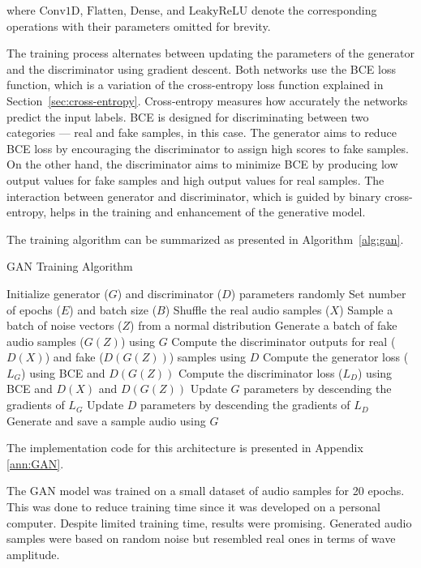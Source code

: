 where $\text{Conv1D}$, $\text{Flatten}$, $\text{Dense}$, and $\text{LeakyReLU}$ denote the corresponding operations with their parameters omitted for brevity.

The training process alternates between updating the parameters of the generator and the discriminator using gradient descent. Both networks use the \ac{BCE} loss function, which is a variation of the cross-entropy loss function explained in Section~\ref{sec:cross-entropy}. Cross-entropy measures how accurately the networks predict the input labels. \Ac{BCE} is designed for discriminating between two categories — real and fake samples, in this case. The generator aims to reduce \ac{BCE} loss by encouraging the discriminator to assign high scores to fake samples. On the other hand, the discriminator aims to minimize \ac{BCE} by producing low output values for fake samples and high output values for real samples. The interaction between generator and discriminator, which is guided by binary cross-entropy, helps in the training and enhancement of the generative model.

The training algorithm can be summarized as presented in Algorithm~\ref{alg:gan}.

\begin{algorithm}
\caption{\ac{GAN} Training Algorithm}
\label{alg:gan}
\begin{algorithmic}[1]
\State Initialize generator ($G$) and discriminator ($D$) parameters randomly
\State Set number of epochs ($E$) and batch size ($B$)
\State Shuffle the real audio samples ($X$)
\State Sample a batch of noise vectors ($Z$) from a normal distribution
\State Generate a batch of fake audio samples ($G(Z)$) using $G$
\State Compute the discriminator outputs for real ($D(X)$) and fake ($D(G(Z))$) samples using $D$
\State Compute the generator loss ($L_G$) using BCE and $D(G(Z))$
\State Compute the discriminator loss ($L_D$) using BCE and $D(X)$ and $D(G(Z))$
\State Update $G$ parameters by descending the gradients of $L_G$
\State Update $D$ parameters by descending the gradients of $L_D$
\EndFor
\State Generate and save a sample audio using $G$
\EndFor
\end{algorithmic}
\end{algorithm}


The implementation code for this architecture is presented in Appendix \ref{ann:GAN}.

The \ac{GAN} model was trained on a small dataset of audio samples for 20 epochs. This was done to reduce training time since it was developed on a personal computer. Despite limited training time, results were promising. Generated audio samples were based on random noise but resembled real ones in terms of wave amplitude.

